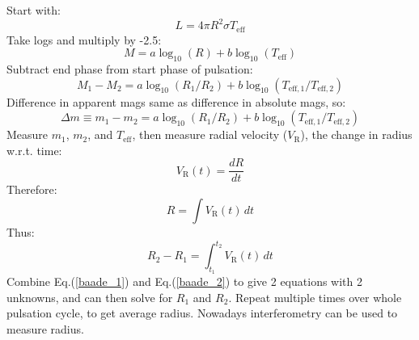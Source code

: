 \documentclass{spy}
\begin{document}
Start with:
\begin{equation}
    L = 4 \pi R^2 \sigma T_\mathrm{eff}
\end{equation}
Take logs and multiply by -2.5:
\begin{equation}
    M = a \log_\mathrm{10}(R) + b \log_\mathrm{10}(T_\mathrm{eff})
\end{equation}
Subtract end phase from start phase of pulsation:
\begin{equation}
    M_\mathrm{1}- M_\mathrm{2}= a \log_\mathrm{10}(R_\mathrm{1}/R_\mathrm{2}) + b \log_\mathrm{10}(T_\mathrm{eff,1}/T_\mathrm{eff,2})
\end{equation}
Difference in apparent mags same as difference in absolute mags, so:
\begin{equation}
    \Delta m \equiv m_\mathrm{1}- m_\mathrm{2}= a \log_\mathrm{10}(R_\mathrm{1}/R_\mathrm{2}) + b \log_\mathrm{10}(T_\mathrm{eff,1}/T_\mathrm{eff,2})
\label{baade_1}
\end{equation}
Measure \(m_\mathrm{1}\), \(m_\mathrm{2}\), and \(T_\mathrm{eff}\), then measure radial velocity (\(V_\mathrm{R}\)), the change in radius w.r.t. time:
\begin{equation}
    V_\mathrm{R}(t) = \frac{dR}{dt}
\end{equation}
Therefore:
\begin{equation}
    R = \int V_\mathrm{R}(t) \,dt
\end{equation}
Thus:
\begin{equation}
    R_\mathrm{2} - R_\mathrm{1} = \int_{t_\mathrm{1}}^{t_\mathrm{2}} V_\mathrm{R}(t) \,dt
\label{baade_2}
\end{equation}
Combine Eq.(\ref{baade_1}) and Eq.(\ref{baade_2}) to give 2 equations with 2 unknowns, and can then solve for \(R_\mathrm{1}\) and \(R_\mathrm{2}\).
Repeat multiple times over whole pulsation cycle, to get average radius.
Nowadays interferometry can be used to measure radius. 




\end{document}
